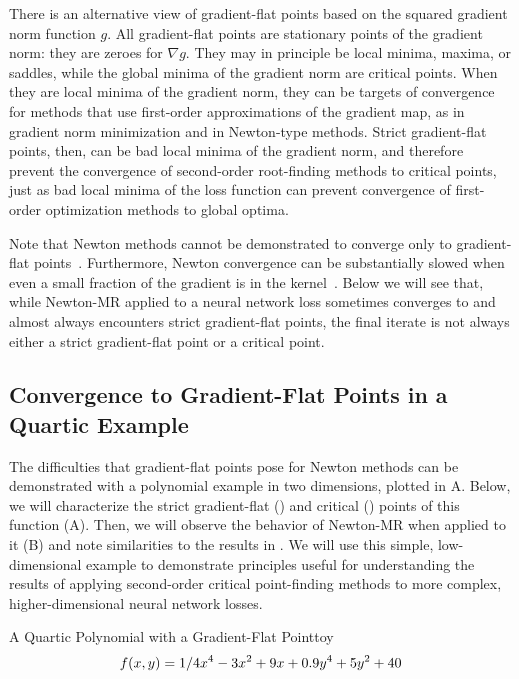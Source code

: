 \documentclass[../../thesis.tex]{subfiles}
\begin{document}
There is an alternative view of gradient-flat points
based on the squared gradient norm function $g$.
All gradient-flat points are stationary points
of the gradient norm:
they are zeroes for $\nabla g$.
They may in principle be local minima, maxima, or saddles,
while the global minima of the gradient norm are critical points.
When they are local minima of the gradient norm,
they can be targets of convergence
for methods that use
first-order approximations of the gradient map,
as in gradient norm minimization and in Newton-type methods.
Strict gradient-flat points, then,
can be bad local minima of the gradient norm,
and therefore prevent the convergence of
second-order root-finding methods
to critical points,
just as bad local minima of the loss function
can prevent convergence of first-order optimization methods
to global optima.

Note that Newton methods cannot be demonstrated to converge
only to gradient-flat points~\cite{powell1970,byrd2004}.
Furthermore, Newton convergence can be substantially slowed
when even a small fraction of the gradient
is in the kernel~\cite{griewank1983}.
Below we will see that,
while Newton-MR applied to a neural network loss
sometimes converges to and almost always encounters strict gradient-flat points,
the final iterate is not always either
a strict gradient-flat point or a critical point.

\subsection{Convergence to Gradient-Flat Points in a Quartic Example}%

The difficulties that gradient-flat points pose for Newton methods
can be demonstrated with a polynomial example in two dimensions,
plotted in A.
Below,
we will characterize
the strict gradient-flat (\failcolor{})
and critical (\successcolor{}) points of this function
(A).
Then, we will observe the behavior of Newton-MR
when applied to it (B)
and note similarities to the results in .
We will use this simple, low-dimensional example
to demonstrate principles useful
for understanding the results of applying
second-order critical point-finding methods to more complex,
higher-dimensional neural network losses.

\begin{example}{A Quartic Polynomial with a Gradient-Flat Point}{toy}
	\begin{equation}\equationlabel{toy}
	    f(x, y) = 1/4 x^4 - 3x^2 + 9x + 0.9y^4 + 5y^2 + 40
	\end{equation}
\end{example}
\end{document}
